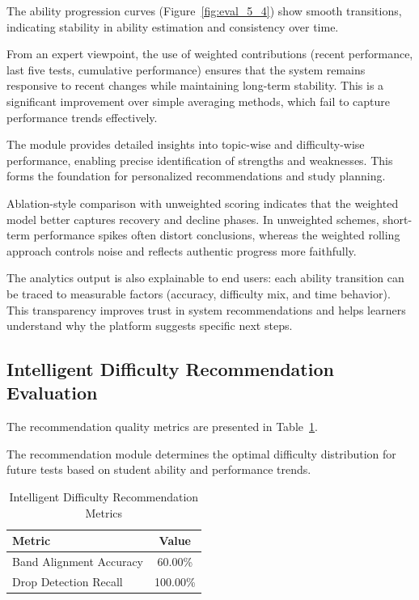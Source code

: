 \begin{sloppypar}
The ability progression curves (Figure~\ref{fig:eval_5_4}) show smooth transitions, indicating stability in ability estimation and consistency over time.

From an expert viewpoint, the use of weighted contributions (recent performance, last five tests, cumulative performance) ensures that the system remains responsive to recent changes while maintaining long-term stability. This is a significant improvement over simple averaging methods, which fail to capture performance trends effectively.

The module provides detailed insights into topic-wise and difficulty-wise performance, enabling precise identification of strengths and weaknesses. This forms the foundation for personalized recommendations and study planning.

Ablation-style comparison with unweighted scoring indicates that the weighted model better captures recovery and decline phases. In unweighted schemes, short-term performance spikes often distort conclusions, whereas the weighted rolling approach controls noise and reflects authentic progress more faithfully.

The analytics output is also explainable to end users: each ability transition can be traced to measurable factors (accuracy, difficulty mix, and time behavior). This transparency improves trust in system recommendations and helps learners understand why the platform suggests specific next steps.

\subsection{Intelligent Difficulty Recommendation Evaluation}

The recommendation quality metrics are presented in Table~\ref{tab:difficulty_recommendation_metrics}.

The recommendation module determines the optimal difficulty distribution for future tests based on student ability and performance trends.

\begin{table}[H]
\centering
\caption{Intelligent Difficulty Recommendation Metrics}
\label{tab:difficulty_recommendation_metrics}
\begin{tabular}{|l|c|}
\hline
Metric & Value \\
\hline
Band Alignment Accuracy & 60.00\% \\
\hline
Drop Detection Recall & 100.00\% \\
\hline
\end{tabular}
\end{table}


\end{sloppypar}
